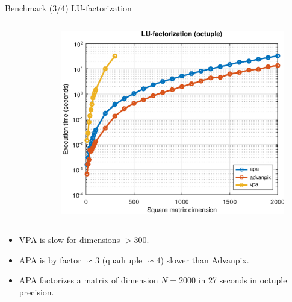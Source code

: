 \begin{frame}{Benchmark (3/4) LU-factorization}
\begin{columns}
\begin{column}{0.3\textwidth}
\begin{figure}
\end{figure}
\end{column}
\begin{column}{0.3\textwidth}
\begin{figure}
\centering
\includegraphics[width=1.0\linewidth]{res/data/2021-11-24_run-01-lu-octuple-semilogy}
\end{figure}
\end{column}
\end{columns}

\bigskip

\begin{itemize}
\item
VPA is slow for dimensions $> 300$.

\item
APA is by factor $\backsim 3$ (quadruple $\backsim 4$) slower than Advanpix.

\item
APA factorizes a matrix of dimension $N = 2000$ in 27 seconds in octuple precision.
\end{itemize}

\end{frame}


